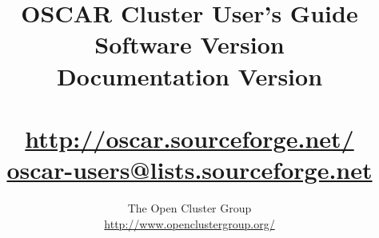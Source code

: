 %
%
%

\title{OSCAR Cluster User's Guide \\
Software Version \oscarversion \\
Documentation Version \docsversion \\
\ \\
\url{http://oscar.sourceforge.net/} \\
\href{mailto:oscar-users@lists.sourceforge.net}{oscar-users@lists.sourceforge.net}}

\author{The Open Cluster Group \\
\url{http://www.openclustergroup.org/}}
\maketitle

